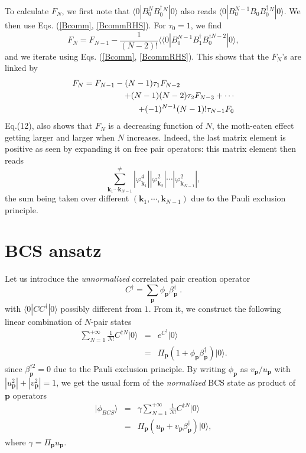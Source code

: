 \documentclass[twocolumn,showpacs]{revtex4}
\def\v#1{\mathbf{#1}}
\begin{document}
To calculate $F_N$, we first note that 
$\langle 0|{B_0^N}B_0^{\dag}{}^{ N}|0\rangle$ also reads $\langle 0|B_0^{N-1}B_0B_0^{\dag}{}^ N|0\rangle$. We then use Eqs. (\ref{Bcomm}, \ref{BcommRHS}). For $\tau_0=1$, we find 
\begin{equation}
F_N=F_{N-1}-\frac{1}{(N-2)!}\langle\langle 0|B_0^{N-1}B_1^\dag B_0^{\dag N-2}|0\rangle,
\end{equation}
and we iterate using Eqs. (\ref{Bcomm}, \ref{BcommRHS}). This shows that the $F_N$'s are linked by
\begin{eqnarray}
F_N=F_{N-1}-(N-1)\tau_1F_{N-2}\hspace{2.3cm}\nonumber\\
+(N-1)(N-2)\tau_2F_{N-3}+\cdots\nonumber\\
+(-1)^{N-1}(N-1)!\tau_{N-1}F_0
\end{eqnarray}
Eq.(12), also shows that $F_N$ is a decreasing function of $N$, the moth-eaten effect getting larger and larger when $N$ increases. Indeed, the last matrix element is positive as seen by expanding it on free pair operators: this matrix element then reads
\begin{equation}
\sum_{\v k_1\cdots \v k_{N-1}}^{\neq}|\varphi_{\v k_1}^4||\varphi_{\v k_2}^2|\cdots|\varphi_{\v k_{N-1}}^2|,
\end{equation}
the sum being taken over different $(\v k_1,\cdots,\v k_{N-1})$ due to the Pauli exclusion principle.

\section{BCS ansatz}

Let us introduce the \emph{unnormalized} correlated pair creation operator
\begin{equation}
C^\dag=\sum_{\v p}\phi_{\v p}\beta_{\v p}^\dag\ .
\end{equation}
with $\langle 0|CC^{\dag }|0\rangle$ possibly different from $1$. From it,  we construct the following linear combination of $N$-pair states
\begin{eqnarray}
\sum_{N=1}^{+\infty}\frac{1}{N!}C^{\dag N}|0\rangle&=&e^{C^\dag}|0\rangle\nonumber\\
&=&\Pi_{\v p}(1+\phi_{\v p}\beta_{\v p}^\dag)|0\rangle.
\end{eqnarray}
since $\beta_{\v p}^{\dag 2}=0$ due to the Pauli exclusion principle. By writing $\phi_{\v p}$ as $v_{\v p}/u_{\v p}$ with $|u_{\v p}^2|+|v_{\v p}^2|=1$, we get the usual form of the \emph{normalized} BCS state as product of $\v p$ operators
\begin{eqnarray}
|\phi_{BCS}\rangle&=&\gamma\sum_{N=1}^{+\infty}\frac{1}{N!}C^{\dag N}|0\rangle\nonumber\\
&=&\Pi_{\v p}(u_{\v p}+v_{\v p}\beta_{\v p}^\dag)|0\rangle,
\end{eqnarray}
where $\gamma=\Pi_{\v p}u_{\v p}$.
\end{document}
